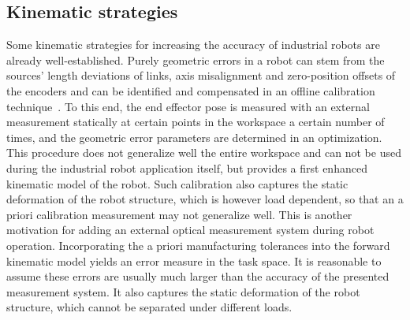 \documentclass[5p,times,procedia]{elsarticle}
\begin{document}
\subsection{Kinematic strategies}
Some kinematic strategies for increasing the accuracy of industrial robots are already well-established.
Purely geometric errors in a robot can stem from the sources' length deviations of links, axis misalignment and zero-position offsets of the encoders and can be identified and compensated in an offline calibration technique~\cite{Wiest01}.
To this end, the end effector pose is measured with an external measurement statically at certain points in the workspace a certain number of times, and the geometric error parameters are determined in an optimization.
This procedure does not generalize well the entire workspace and can not be used during the industrial robot application itself, but provides a first enhanced kinematic model of the robot.
Such calibration also captures the static deformation of the robot structure, which is however load dependent, so that an a priori calibration measurement may not generalize well. This is another motivation for adding an external optical measurement system during robot operation.
Incorporating the a priori manufacturing tolerances into the forward kinematic model yields an error measure in the task space.
It is reasonable to assume these errors are usually much larger than the accuracy of the presented measurement system. It also captures the static deformation of the robot structure, which cannot be separated under different loads.
%
\end{document}
